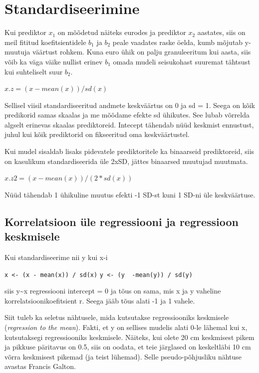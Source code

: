 \documentclass[]{book}
\begin{document}
\section{Standardiseerimine}\label{standardiseerimine}

Kui prediktor \(x_1\) on mõõdetud näiteks eurodes ja prediktor \(x_2\)
aastates, siis on meil fititud koefitsientidele \(b_1\) ja \(b_2\) peale
vaadates raske öelda, kumb mõjutab y-muutuja väärtust rohkem. Kuna euro
ühik on palju granuleeritum kui aasta, siis võib ka väga väike nullist
erinev \(b_1\) omada mudeli seisukohast suuremat tähtsust kui
suhteliselt suur \(b_2\).

\(x.z = (x - mean(x))/sd(x)\)

Sellisel viisil standardiseeritud andmete keskväärtus on 0 ja sd = 1.
Seega on kõik predikorid samas skaalas ja me mõõdame efekte sd ühikutes.
See lubab võrrelda algselt erinevas skaalas prediktoreid. Intecept
tähendab nüüd keskmist ennustust, juhul kui kõik prediktorid on
fikseeritud oma keskväärtustel.

Kui mudel sisaldab lisaks pidevatele prediktoritele ka binaarseid
prediktoreid, siis on kasulikum standardiseerida üle 2xSD, jättes
binaarsed muutujad muutmata.

\(x.z2 = (x - mean(x))/(2 * sd(x))\)

Nüüd tähendab 1 ühikuline muutus efekti -1 SD-st kuni 1 SD-ni üle
keskväärtuse.

\subsection*{Korrelatsioon üle regressiooni ja regressioon
keskmisele}\label{korrelatsioon-ule-regressiooni-ja-regressioon-keskmisele}

Kui standardiseerime nii y kui x-i

\texttt{x\ \textless{}-\ (x\ -\ mean(x))\ /\ sd(x)}
\texttt{y\ \textless{}-\ (y\ \ -mean(y))\ /\ sd(y)}

siis y\textasciitilde{}x regressiooni intercept = 0 ja tõus on sama, mis
x ja y vaheline korrelatsioonikoefitsient r. Seega jääb tõus alati -1 ja
1 vahele.

Siit tuleb ka seletus nähtusele, mida kutsutakse regressiooniks
keskmisele (\emph{regression to the mean}). Fakti, et y on sellises
mudelis alati 0-le lähemal kui x, kutsutaksegi regressiooniks
keskmisele. Näiteks, kui olete 20 cm keskmisest pikem ja pikkuse
päritavus on 0.5, siis on oodata, et teie järglased on keskeltläbi 10 cm
võrra keskmisest pikemad (ja teist lühemad). Selle pseudo-põhjusliku
nähtuse avastas Francis Galton.
\end{document}
